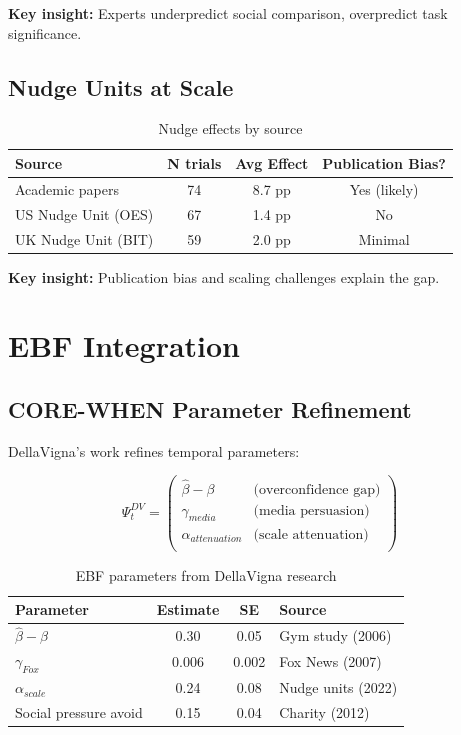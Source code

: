 \textbf{Key insight:} Experts underpredict social comparison, overpredict task significance.

\subsection{Nudge Units at Scale}

\begin{table}[h]
\centering
\begin{tabular}{lccc}
\hline
\textbf{Source} & \textbf{N trials} & \textbf{Avg Effect} & \textbf{Publication Bias?} \\
\hline
Academic papers & 74 & 8.7 pp & Yes (likely) \\
US Nudge Unit (OES) & 67 & 1.4 pp & No \\
UK Nudge Unit (BIT) & 59 & 2.0 pp & Minimal \\
\hline
\end{tabular}
\caption{Nudge effects by source}
\end{table}

\textbf{Key insight:} Publication bias and scaling challenges explain the gap.

\section{EBF Integration}

\subsection{CORE-WHEN Parameter Refinement}

DellaVigna's work refines temporal parameters:

\begin{equation}
\Psi_t^{DV} = \begin{pmatrix}
\hat{\beta} - \beta & \text{(overconfidence gap)} \\
\gamma_{media} & \text{(media persuasion)} \\
\alpha_{attenuation} & \text{(scale attenuation)} \\
\end{pmatrix}
\end{equation}

\begin{table}[h]
\centering
\begin{tabular}{lccl}
\hline
\textbf{Parameter} & \textbf{Estimate} & \textbf{SE} & \textbf{Source} \\
\hline
$\hat{\beta} - \beta$ & 0.30 & 0.05 & Gym study (2006) \\
$\gamma_{Fox}$ & 0.006 & 0.002 & Fox News (2007) \\
$\alpha_{scale}$ & 0.24 & 0.08 & Nudge units (2022) \\
Social pressure avoid & 0.15 & 0.04 & Charity (2012) \\
\hline
\end{tabular}
\caption{EBF parameters from DellaVigna research}
\end{table}

